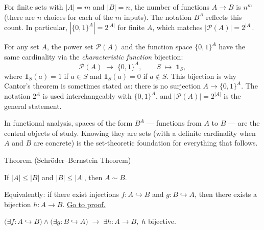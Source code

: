 \begin{remark*}
For finite sets with $|A| = m$ and $|B| = n$, the number of functions
$A \to B$ is $n^m$ (there are $n$ choices for each of the $m$ inputs).
The notation $B^A$ reflects this count. In particular, $|\{0,1\}^A| = 2^{|A|}$
for finite $A$, which matches $|\mathcal{P}(A)| = 2^{|A|}$.
\end{remark*}

\begin{remark*}
\label{rem:characteristic-fn}
For any set $A$, the power set $\mathcal{P}(A)$ and the function space
$\{0,1\}^A$ have the same cardinality via the \emph{characteristic function}
bijection:
\[
\mathcal{P}(A) \;\to\; \{0,1\}^A,
\qquad
S \;\mapsto\; \mathbf{1}_S,
\]
where $\mathbf{1}_S(a) = 1$ if $a \in S$ and $\mathbf{1}_S(a) = 0$ if
$a \notin S$. This bijection is why Cantor's theorem is sometimes stated as:
there is no surjection $A \to \{0,1\}^A$. The notation $2^A$ is used
interchangeably with $\{0,1\}^A$, and $|\mathcal{P}(A)| = 2^{|A|}$ is
the general statement.

In functional analysis, spaces of the form $B^A$ — functions from $A$ to
$B$ — are the central objects of study. Knowing they are sets (with a definite
cardinality when $A$ and $B$ are concrete) is the set-theoretic foundation
for everything that follows.
\end{remark*}


\begin{theorembox}{Theorem (Schröder--Bernstein Theorem)}
\begin{theorem}\label{thm:schroder-bernstein}
If $|A| \leq |B|$ and $|B| \leq |A|$, then $A \sim B$.

Equivalently: if there exist injections $f : A \hookrightarrow B$ and
$g : B \hookrightarrow A$, then there exists a bijection $h : A \to B$.
\hyperref[prf:schroder-bernstein]{Go to proof.}
\end{theorem}
\end{theorembox}

\begin{remark*}
$\bigl(\exists f: A\hookrightarrow B\bigr) \wedge \bigl(\exists g: B\hookrightarrow A\bigr) \;\to\; \exists h: A\to B,\; h$ bijective.
\end{remark*}


